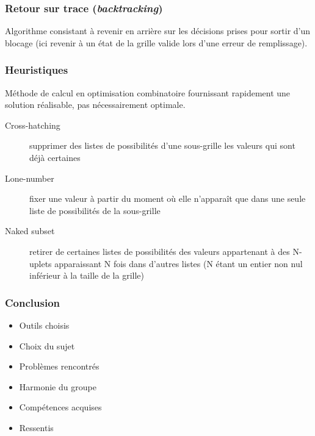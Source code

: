 \documentclass{beamer}
\begin{document}
	
	\begin{frame}
	\frametitle{Retour sur trace (\textit{backtracking})}
		\begin{definition}
		Algorithme consistant à revenir en arrière sur les décisions prises pour sortir d'un blocage (ici revenir à un état de la grille valide lors d'une erreur de remplissage).
		\end{definition}
	\end{frame}
	

	\begin{frame}
	\frametitle{Heuristiques}
	\begin{definition}
        Méthode de calcul en optimisation combinatoire fournissant rapidement une solution réalisable, pas nécessairement optimale.
   	\end{definition}
   	\begin{description}
        	\item[Cross-hatching] supprimer des listes de possibilités d’une sous-grille les valeurs qui sont déjà certaines
		\item[Lone-number] fixer une valeur à partir du moment où elle n'apparaît que dans une seule liste de possibilités de la sous-grille
		\item[Naked subset] retirer de certaines listes de possibilités des valeurs appartenant à des N-uplets apparaissant N fois dans d'autres listes (N étant un entier non nul inférieur à la taille de la grille)
	\end{description}
	\end{frame}

		

	\begin{frame}
	\frametitle{Conclusion}
	\begin{itemize}
    		\item Outils choisis
    		\item Choix du sujet
    		\item Problèmes rencontrés
    		\item Harmonie du groupe
    		\item Compétences acquises
    		\item Ressentis
    	\end{itemize}
 	\end{frame}
\end{document}
